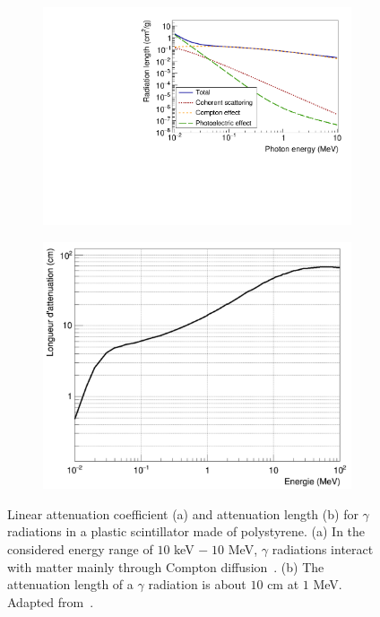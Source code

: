 \begin{figure}[h]
  \centering
  \begin{subfigure}[t]{0.48\textwidth}
    \centering
    \includegraphics[width=1\textwidth]{commissioning/fig_commissioning/photon_energy_loss.pdf}
    \captionsetup{justification=centering}
    \caption{\label{subfig:photon_energy_loss}}
  \end{subfigure}
  \hfill
  \begin{subfigure}[t]{0.48\textwidth}
    \centering
    \includegraphics[width=1\textwidth]{commissioning/fig_commissioning/attenuation_length_photons.pdf}
    \captionsetup{justification=centering}
    \caption{\label{subfig:attenuation_length_photons}}
  \end{subfigure}
  \caption{Linear attenuation coefficient (a) and attenuation length (b) for $\gamma$ radiations in a plastic scintillator made of polystyrene.
    (a) In the considered energy range of $10$ keV $ -\; 10$ MeV, $\gamma$ radiations interact with matter mainly through Compton diffusion~\cite{web:nist_Xcom}.
    (b) The attenuation length of a $\gamma$ radiation is about $10$ cm at $1$ MeV.
    Adapted from~\cite{HuberThesis}.
  }
\end{figure}
